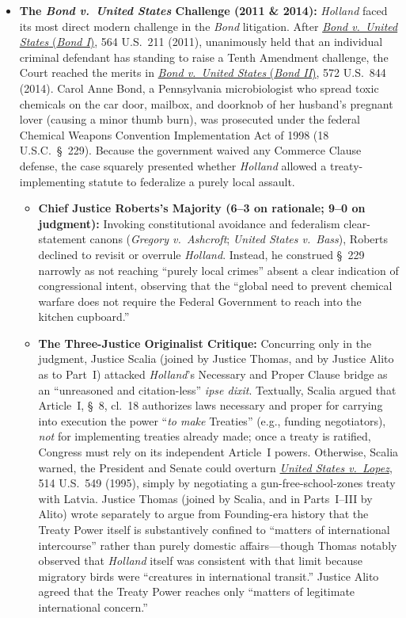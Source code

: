 \documentclass[12pt]{article}
\begin{document}
\begin{itemize}
\item \textbf{The \textit{Bond v.\ United States} Challenge (2011 \& 2014):} \textit{Holland} faced its most direct modern challenge in the \textit{Bond} litigation. After \href{https://supreme.justia.com/cases/federal/us/564/211/}{\textit{Bond v.\ United States} (\textit{Bond I})}, 564 U.S.\ 211 (2011), unanimously held that an individual criminal defendant has standing to raise a Tenth Amendment challenge, the Court reached the merits in \href{https://supreme.justia.com/cases/federal/us/572/844/}{\textit{Bond v.\ United States} (\textit{Bond II})}, 572 U.S.\ 844 (2014). Carol Anne Bond, a Pennsylvania microbiologist who spread toxic chemicals on the car door, mailbox, and doorknob of her husband's pregnant lover (causing a minor thumb burn), was prosecuted under the federal Chemical Weapons Convention Implementation Act of 1998 (18 U.S.C.\ \S~229). Because the government waived any Commerce Clause defense, the case squarely presented whether \textit{Holland} allowed a treaty-implementing statute to federalize a purely local assault.
  \begin{itemize}
    \item \textbf{Chief Justice Roberts's Majority (6--3 on rationale; 9--0 on judgment):} Invoking constitutional avoidance and federalism clear-statement canons (\textit{Gregory v.\ Ashcroft}; \textit{United States v.\ Bass}), Roberts declined to revisit or overrule \textit{Holland}. Instead, he construed \S~229 narrowly as not reaching ``purely local crimes'' absent a clear indication of congressional intent, observing that the ``global need to prevent chemical warfare does not require the Federal Government to reach into the kitchen cupboard.''
    \item \textbf{The Three-Justice Originalist Critique:} Concurring only in the judgment, Justice Scalia (joined by Justice Thomas, and by Justice Alito as to Part~I) attacked \textit{Holland}'s Necessary and Proper Clause bridge as an ``unreasoned and citation-less'' \textit{ipse dixit}. Textually, Scalia argued that Article~I, \S~8, cl.\ 18 authorizes laws necessary and proper for carrying into execution the power ``\textit{to make} Treaties'' (e.g., funding negotiators), \textit{not} for implementing treaties already made; once a treaty is ratified, Congress must rely on its independent Article~I powers. Otherwise, Scalia warned, the President and Senate could overturn \href{https://supreme.justia.com/cases/federal/us/514/549/}{\textit{United States v.\ Lopez}}, 514 U.S.\ 549 (1995), simply by negotiating a gun-free-school-zones treaty with Latvia. Justice Thomas (joined by Scalia, and in Parts~I--III by Alito) wrote separately to argue from Founding-era history that the Treaty Power itself is substantively confined to ``matters of international intercourse'' rather than purely domestic affairs---though Thomas notably observed that \textit{Holland} itself was consistent with that limit because migratory birds were ``creatures in international transit.'' Justice Alito agreed that the Treaty Power reaches only ``matters of legitimate international concern.''
  \end{itemize}

\end{itemize}
\end{document}
